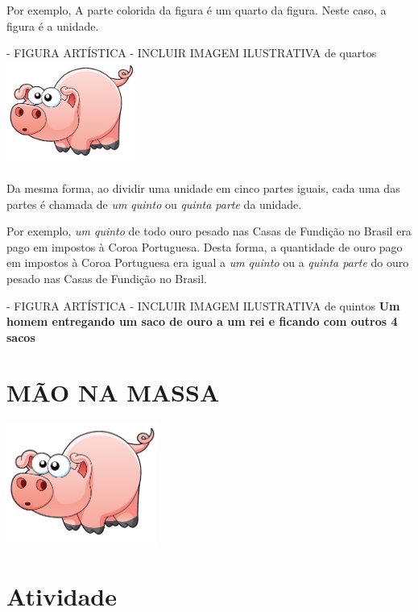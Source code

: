 \documentclass[a4,12pt]{book}
\begin{document}
Por exemplo,
A parte colorida da figura é um quarto da figura. Neste caso, a figura é a unidade.


\begin{imagem*}[breakable]{}{}   - FIGURA ARTÍSTICA - INCLUIR IMAGEM ILUSTRATIVA de quartos
    \includegraphics[width=120pt, keepaspectratio]{pig}
   \end{imagem*}

Da mesma forma, ao dividir uma unidade em cinco partes iguais, cada uma das partes é chamada de {\it um quinto} ou {\it quinta parte} da unidade.

Por exemplo,
{\it um quinto} de todo ouro pesado nas Casas de Fundição no Brasil era pago em impostos à Coroa Portuguesa. Desta forma, a quantidade de ouro pago em impostos à Coroa Portuguesa era igual a {\it um quinto} ou a {\it quinta parte} do ouro pesado nas Casas de Fundição no Brasil.

\begin{imagem*}[breakable]{}{}   - FIGURA ARTÍSTICA - INCLUIR IMAGEM ILUSTRATIVA de quintos
  {\bf Um homem entregando um saco de ouro a um rei e ficando com outros 4 sacos}
\end{imagem*}









\section*{ MÃO NA MASSA }


\includegraphics[width=\textwidth,height=4cm, keepaspectratio]{pig}
\section{Atividade}
\end{document}
